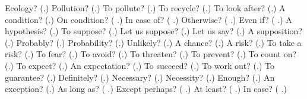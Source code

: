 \begin{tcolorbox}[breakable,colback=teal!4,colframe=teal!35!black,title={Before you move on}]
Ecology? (\textbf{}.) Pollution? (\textbf{}.) To pollute? (\textbf{}.) To recycle? (\textbf{}.) To look after? (\textbf{}.) A condition? (\textbf{}.) On condition? (\textbf{ }.) In case of? (\textbf{ }.) Otherwise? (\textbf{  }.) Even if? (\textbf{ }.) A hypothesis? (\textbf{}.) To suppose? (\textbf{}.) Let us suppose? (\textbf{}.) Let us say? (\textbf{}.) A supposition? (\textbf{}.) Probably? (\textbf{}.) Probability? (\textbf{}.) Unlikely? (\textbf{}.) A chance? (\textbf{}.) A risk? (\textbf{}.) To take a risk? (\textbf{}.) To fear? (\textbf{}.) To avoid? (\textbf{}.) To threaten? (\textbf{}.) To prevent? (\textbf{}.) To count on? (\textbf{}.) To expect? (\textbf{}.) An expectation? (\textbf{}.) To succeed? (\textbf{}.) To work out? (\textbf{}.) To guarantee? (\textbf{}.) Definitely? (\textbf{}.) Necessary? (\textbf{}.) Necessity? (\textbf{}.) Enough? (\textbf{}.) An exception? (\textbf{}.) As long as? (\textbf{ }.) Except perhaps? (\textbf{ }.) At least? (\textbf{ }.) In case? (\textbf{  }.)
\end{tcolorbox}

